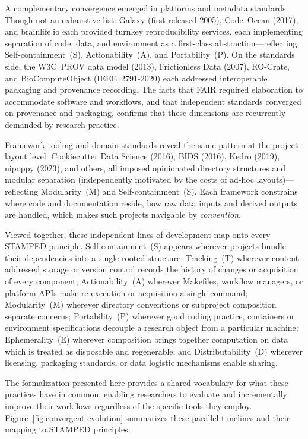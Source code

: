 \documentclass{article}
\begin{document}
A complementary convergence emerged in platforms and metadata standards.
Though not an exhaustive list: Galaxy\cite{afgan_galaxy_2018} (first released 2005), Code~Ocean (2017), and brainlife.io\cite{hayashi_brainlifeio_2024} each provided turnkey reproducibility services, each implementing separation of code, data, and environment as a first-class abstraction---reflecting Self-containment~(S), Actionability~(A), and Portability~(P).
On the standards side, the W3C~PROV data model (2013), Frictionless Data (2007), RO-Crate\cite{peroni_packaging_2022}, and BioComputeObject (IEEE~2791-2020) each addressed interoperable packaging and provenance recording.
The facts that FAIR required elaboration to accommodate software\cite{barker_introducing_2022} and workflows\cite{goble_fair_2020,wilkinson_applying_2025}, and that independent standards converged on provenance and packaging, confirms that these dimensions are recurrently demanded by research practice.

Framework tooling and domain standards reveal the same pattern at the project-layout level.
Cookiecutter Data Science (2016), BIDS\cite{gorgolewski_brain_2016} (2016), Kedro (2019), nipoppy (2023), and others, all imposed opinionated directory structures and modular separation (independently motivated by the costs of ad-hoc layouts)---reflecting Modularity~(M) and Self-containment~(S).
Each framework constrains where code and documentation reside, how raw data inputs and derived outputs are handled, which makes such projects navigable by \emph{convention}.

Viewed together, these independent lines of development map onto every STAMPED principle.
Self-containment~(S) appears wherever projects bundle their dependencies into a single rooted structure;
Tracking~(T) wherever content-addressed storage or version control records the history of changes or acquisition of every component;
Actionability~(A) wherever Makefiles, workflow managers, or platform APIs make re-execution or acquisition a single command;
Modularity~(M) wherever directory conventions or subproject composition separate concerns;
Portability~(P) wherever good coding practice, containers or environment specifications decouple a research object from a particular machine;
Ephemerality~(E) wherever composition brings together computation on data which is treated as disposable and regenerable;
and Distributability~(D) wherever licensing, packaging standards, or data logistic mechanisms enable sharing.

The formalization presented here provides a shared vocabulary for what these practices have in common, enabling researchers to evaluate and incrementally improve their workflows regardless of the specific tools they employ.
Figure~\ref{fig:convergent-evolution} summarizes these parallel timelines and their mapping to STAMPED principles.
\end{document}
